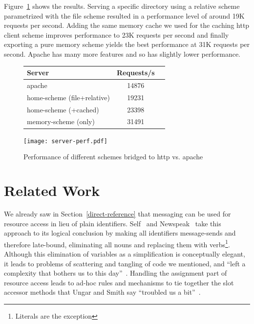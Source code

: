 \documentclass[preprint]{sigplanconf}
\begin{document}
Figure~\ref{http-server-speed} shows the results.  Serving a specific directory using a relative scheme parametrized
with the file scheme resulted in a performance level of around 19K requests per second.  Adding the same memory cache
we used for the caching http client scheme improves performance to 23K requests per second and finally exporting a pure
memory scheme yields the best performance at 31K requests per second.   Apache has many more features and so
has slightly lower performance.

\begin{figure}
\begin{minipage}[c]{0.58\textwidth}
\begin{tabular}{|l|c|c|} \hline
Server   &  Requests/s    \\ \hline
apache & 	14876	      \\ %
home-scheme (file+relative) &  19231   \\ %
home-scheme (+cached)  &  23398  \\ %
memory-scheme (only) &  31491  \\ \hline
\end{tabular}
\end{minipage}
\begin{minipage}[c]{0.58\textwidth}
\texttt{[image: server-perf.pdf]}
\end{minipage}
\vspace{-2.0em}
\caption{Performance of different schemes bridged to http vs. apache}
\label{http-server-speed}
\end{figure}





\section{Related Work}
\label{related-work}


We already saw in Section~\ref{direct-reference} that messaging can be used for resource
access in lieu of plain identifiers.  Self~\cite{UngarS87} and Newspeak~\cite{Bracha:2010:MON:1883978.1884007} take this
approach to its logical conclusion by making all identifiers message-sends and therefore late-bound, eliminating
all nouns and replacing them with verbs\footnote{Literals are the exception}.  Although
this elimination of variables as a simplification is conceptually elegant, it leads to problems of scattering and tangling of code we
mentioned, and  ``left a complexity that bothers us to this day''~\cite{Ungar:2007:SEL:1238844.1238853}.
Handling the assignment part of resource access leads to ad-hoc rules and mechanisms to tie together
the slot accessor methods that Ungar and Smith say ``troubled us a bit''~\cite{Ungar:2007:SEL:1238844.1238853}.
\end{document}
